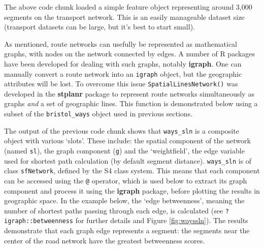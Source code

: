 \documentclass[]{krantz}
\newenvironment{Shaded}{\begin{snugshade}}{\end{snugshade}}
\newcommand{\CommentTok}[1]{\textcolor[rgb]{0.37,0.37,0.37}{\textit{#1}}}
\newcommand{\KeywordTok}[1]{\textcolor[rgb]{0.27,0.27,0.27}{\textbf{#1}}}
\newcommand{\NormalTok}[1]{#1}
\newcommand{\OperatorTok}[1]{\textcolor[rgb]{0.43,0.43,0.43}{\textbf{#1}}}
\newcommand{\StringTok}[1]{\textcolor[rgb]{0.5,0.5,0.5}{#1}}
\begin{document}
The above code chunk loaded a simple feature object representing around 3,000 segments on the transport network.
This is an easily manageable dataset size (transport datasets can be large, but it's best to start small).

As mentioned, route networks can usefully be represented as mathematical graphs, with nodes on the network connected by edges.
A number of R packages have been developed for dealing with such graphs, notably \textbf{igraph}.
One can manually convert a route network into an \texttt{igraph} object, but the geographic attributes will be lost.
To overcome this issue \texttt{SpatialLinesNetwork()} was developed in the \textbf{stplanr} package to represent route networks simultaneously as graphs \emph{and} a set of geographic lines.
This function is demonstrated below using a subset of the \texttt{bristol\_ways} object used in previous sections.

\begin{Shaded}
\end{Shaded}

The output of the previous code chunk shows that \texttt{ways\_sln} is a composite object with various `slots'.
These include: the spatial component of the network (named \texttt{sl}), the graph component (\texttt{g}) and the `weightfield', the edge variable used for shortest path calculation (by default segment distance).
\texttt{ways\_sln} is of class \texttt{sfNetwork}, defined by the S4 class system.
This means that each component can be accessed using the \texttt{@} operator, which is used below to extract its graph component and process it using the \textbf{igraph} package, before plotting the results in geographic space.
In the example below, the `edge betweenness', meaning the number of shortest paths passing through each edge, is calculated (see \texttt{?igraph::betweenness} for further details and Figure \ref{fig:wayssln}).
The results demonstrate that each graph edge represents a segment: the segments near the center of the road network have the greatest betweenness scores.
\end{document}
